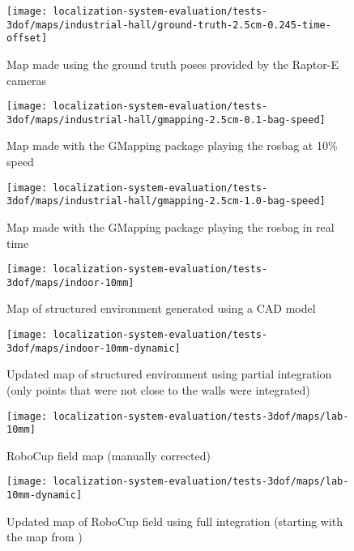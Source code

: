 \begin{figure}[H]
	\centering
	\texttt{[image: localization-system-evaluation/tests-3dof/maps/industrial-hall/ground-truth-2.5cm-0.245-time-offset]}
	\caption{Map made using the ground truth poses provided by the Raptor-E cameras}
	\label{fig:localization-system-evaluation_ground-truth-2.5cm-0.245-time-offset}
\end{figure}


\begin{figure}[H]
	\centering
	\texttt{[image: localization-system-evaluation/tests-3dof/maps/industrial-hall/gmapping-2.5cm-0.1-bag-speed]}
	\caption{Map made with the GMapping package playing the rosbag at 10\% speed}
	\label{fig:localization-system-evaluation_gmapping-2.5cm-0.1-bag-speed}
\end{figure}

\begin{figure}[H]
	\centering
	\texttt{[image: localization-system-evaluation/tests-3dof/maps/industrial-hall/gmapping-2.5cm-1.0-bag-speed]}
	\caption{Map made with the GMapping package playing the rosbag in real time}
	\label{fig:localization-system-evaluation_gmapping-2.5cm-1.0-bag-speed}
\end{figure}


\begin{figure}[H]
	\centering
	\texttt{[image: localization-system-evaluation/tests-3dof/maps/indoor-10mm]}
	\caption{Map of structured environment generated using a CAD model}
	\label{fig:localization-system-evaluation_indoor-10mm}
\end{figure}

\begin{figure}[H]
	\centering
	\texttt{[image: localization-system-evaluation/tests-3dof/maps/indoor-10mm-dynamic]}
	\caption{Updated map of structured environment using partial integration (only points that were not close to the walls were integrated)}
	\label{fig:localization-system-evaluation_indoor-10mm-dynamic}
\end{figure}

\begin{figure}[H]
	\centering
	\texttt{[image: localization-system-evaluation/tests-3dof/maps/lab-10mm]}
	\caption{RoboCup field map (manually corrected)}
	\label{fig:localization-system-evaluation_lab-10mm}
\end{figure}

\begin{figure}[H]
	\centering
	\texttt{[image: localization-system-evaluation/tests-3dof/maps/lab-10mm-dynamic]}
	\caption{Updated map of RoboCup field using full integration (starting with the map from )}
	\label{fig:localization-system-evaluation_lab-10mm-dynamic}
\end{figure}



